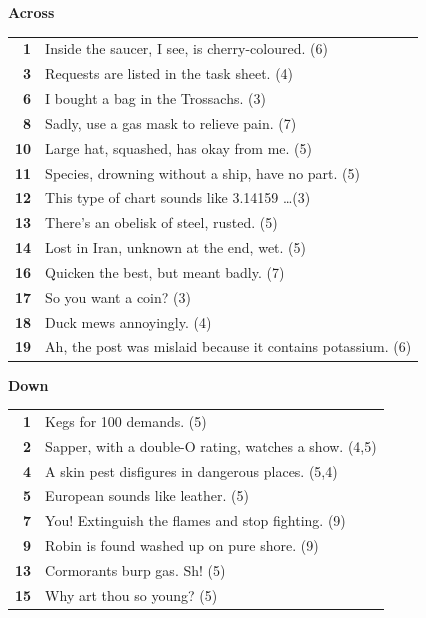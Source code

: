 \documentclass[a4paper,twoside,twocolumn]{article}
\begin{document}
\noindent \textbf{Across} \\[2ex]
{\renewcommand{\arraystretch}{1.2}
\begin{tabular}{r p{6.7cm}}
 \textbf{1} & Inside the saucer, I see, is cherry-coloured. (6) \\
 \textbf{3} & Requests are listed in the task sheet. (4) \\
 \textbf{6} & I bought a bag in the Trossachs. (3) \\
 \textbf{8} & Sadly, use a gas mask to relieve pain. (7) \\
 \textbf{10} & Large hat, squashed, has okay from me. (5) \\
 \textbf{11} & Species, drowning without a ship, have no part. (5) \\
 \textbf{12} & This type of chart sounds like 3.14159 \dots (3) \\
 \textbf{13} & There's an obelisk of steel, rusted. (5) \\
 \textbf{14} & Lost in Iran, unknown at the end, wet. (5) \\
 \textbf{16} & Quicken the best, but meant badly. (7) \\
 \textbf{17} & So you want a coin? (3) \\
 \textbf{18} & Duck mews annoyingly. (4) \\
 \textbf{19} & Ah, the post was mislaid because it contains potassium. (6) \\
\end{tabular}}

\noindent \textbf{Down} \\[2ex]
{
\renewcommand{\arraystretch}{1.2}
\begin{tabular}{r p{6.7cm}}
 \textbf{1} & Kegs for 100 demands. (5) \\
 \textbf{2} & Sapper, with a double-O rating, watches a show. (4,5) \\
 \textbf{4} & A skin pest disfigures in dangerous places. (5,4) \\
 \textbf{5} & European sounds like leather. (5) \\
 \textbf{7} & You! Extinguish the flames and stop fighting. (9) \\
 \textbf{9} & Robin is found washed up on pure shore. (9) \\
 \textbf{13} & Cormorants burp gas. Sh! (5) \\
 \textbf{15} & Why art thou so young? (5) \\
\end{tabular}}
\end{document}

